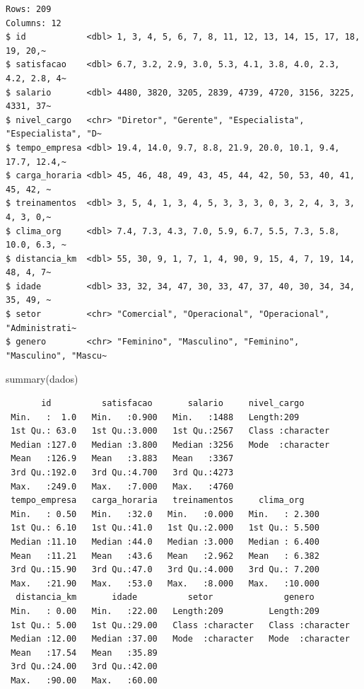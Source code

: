 \documentclass[
  letterpaper,
  DIV=11,
  numbers=noendperiod]{scrartcl}
\newenvironment{Shaded}{\begin{snugshade}}{\end{snugshade}}
\newcommand{\FunctionTok}[1]{\textcolor[rgb]{0.28,0.35,0.67}{#1}}
\newcommand{\NormalTok}[1]{\textcolor[rgb]{0.00,0.23,0.31}{#1}}
\begin{document}
\begin{verbatim}
Rows: 209
Columns: 12
$ id            <dbl> 1, 3, 4, 5, 6, 7, 8, 11, 12, 13, 14, 15, 17, 18, 19, 20,~
$ satisfacao    <dbl> 6.7, 3.2, 2.9, 3.0, 5.3, 4.1, 3.8, 4.0, 2.3, 4.2, 2.8, 4~
$ salario       <dbl> 4480, 3820, 3205, 2839, 4739, 4720, 3156, 3225, 4331, 37~
$ nivel_cargo   <chr> "Diretor", "Gerente", "Especialista", "Especialista", "D~
$ tempo_empresa <dbl> 19.4, 14.0, 9.7, 8.8, 21.9, 20.0, 10.1, 9.4, 17.7, 12.4,~
$ carga_horaria <dbl> 45, 46, 48, 49, 43, 45, 44, 42, 50, 53, 40, 41, 45, 42, ~
$ treinamentos  <dbl> 3, 5, 4, 1, 3, 4, 5, 3, 3, 3, 0, 3, 2, 4, 3, 3, 4, 3, 0,~
$ clima_org     <dbl> 7.4, 7.3, 4.3, 7.0, 5.9, 6.7, 5.5, 7.3, 5.8, 10.0, 6.3, ~
$ distancia_km  <dbl> 55, 30, 9, 1, 7, 1, 4, 90, 9, 15, 4, 7, 19, 14, 48, 4, 7~
$ idade         <dbl> 33, 32, 34, 47, 30, 33, 47, 37, 40, 30, 34, 34, 35, 49, ~
$ setor         <chr> "Comercial", "Operacional", "Operacional", "Administrati~
$ genero        <chr> "Feminino", "Masculino", "Feminino", "Masculino", "Mascu~
\end{verbatim}

\begin{Shaded}
\begin{Highlighting}[]
\FunctionTok{summary}\NormalTok{(dados)}
\end{Highlighting}
\end{Shaded}

\begin{verbatim}
       id          satisfacao       salario     nivel_cargo       
 Min.   :  1.0   Min.   :0.900   Min.   :1488   Length:209        
 1st Qu.: 63.0   1st Qu.:3.000   1st Qu.:2567   Class :character  
 Median :127.0   Median :3.800   Median :3256   Mode  :character  
 Mean   :126.9   Mean   :3.883   Mean   :3367                     
 3rd Qu.:192.0   3rd Qu.:4.700   3rd Qu.:4273                     
 Max.   :249.0   Max.   :7.000   Max.   :4760                     
 tempo_empresa   carga_horaria   treinamentos     clima_org     
 Min.   : 0.50   Min.   :32.0   Min.   :0.000   Min.   : 2.300  
 1st Qu.: 6.10   1st Qu.:41.0   1st Qu.:2.000   1st Qu.: 5.500  
 Median :11.10   Median :44.0   Median :3.000   Median : 6.400  
 Mean   :11.21   Mean   :43.6   Mean   :2.962   Mean   : 6.382  
 3rd Qu.:15.90   3rd Qu.:47.0   3rd Qu.:4.000   3rd Qu.: 7.200  
 Max.   :21.90   Max.   :53.0   Max.   :8.000   Max.   :10.000  
  distancia_km       idade          setor              genero         
 Min.   : 0.00   Min.   :22.00   Length:209         Length:209        
 1st Qu.: 5.00   1st Qu.:29.00   Class :character   Class :character  
 Median :12.00   Median :37.00   Mode  :character   Mode  :character  
 Mean   :17.54   Mean   :35.89                                        
 3rd Qu.:24.00   3rd Qu.:42.00                                        
 Max.   :90.00   Max.   :60.00                                        
\end{verbatim}
\end{document}
